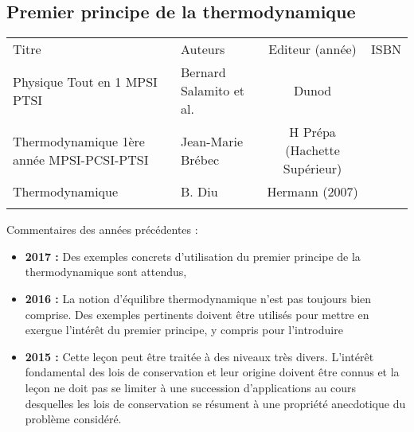 \begin{headerBlock}
    \chapter{Premier principe de la thermodynamique}
    \label{LP_PremierPrincipe}
\end{headerBlock}




\begin{center}
\begin{tabularx}{\textwidth}{| X | X | c | c |}
  \hline
  \rowcolor{gray!20}\multicolumn{4}{c}{Bibliographie de la leçon : } \\
  \hline 
  Titre & Auteurs & Editeur (année) & ISBN \\
  \hline
 Physique Tout en 1 MPSI PTSI & Bernard Salamito et al.  & Dunod &    \\
  \hline 
 Thermodynamique 1ère année MPSI-PCSI-PTSI & Jean-Marie Brébec  & H Prépa (Hachette Supérieur)  &    \\
  \hline 
 Thermodynamique & B. Diu & Hermann (2007) &  \\
  \hline 
 &   &   &    \\
  \hline
\end{tabularx}
\end{center}

\begin{reportBlock}{Commentaires des années précédentes :}
    \begin{itemize}
        \item \textbf{2017 :} Des exemples concrets d’utilisation du premier principe de la thermodynamique sont attendus,
        \item \textbf{2016 :} La notion d’équilibre thermodynamique n’est pas toujours bien comprise. Des exemples pertinents doivent être utilisés pour mettre en exergue l’intérêt du premier principe, y compris pour l’introduire
        \item \textbf{2015 :} Cette leçon peut être traitée à des niveaux très divers. L’intérêt fondamental des lois de conservation et leur origine doivent être connus et la leçon ne doit pas se limiter à une succession d’applications au cours desquelles les lois de conservation se résument à une propriété anecdotique du problème considéré.
    \end{itemize}
\end{reportBlock}

